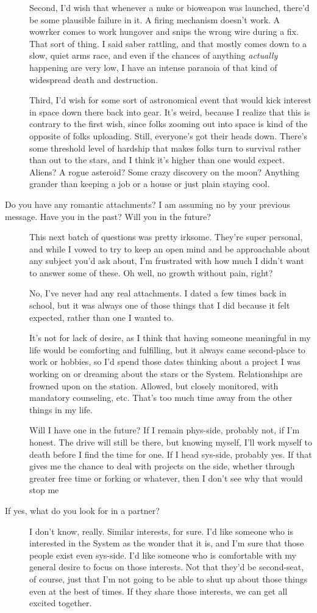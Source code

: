 \begin{description}
Second, I'd wish that whenever a nuke or bioweapon was launched, there'd be some plausible failure in it. A firing mechanism doesn't work. A wowrker comes to work hungover and snips the wrong wire during a fix. That sort of thing. I said saber rattling, and that mostly comes down to a slow, quiet arms race, and even if the chances of anything \emph{actually} happening are very low, I have an intense paranoia of that kind of widespread death and destruction.

Third, I'd wish for some sort of astronomical event that would kick interest in space down there back into gear. It's weird, because I realize that this is contrary to the first wish, since folks zooming out into space is kind of the opposite of folks uploading. Still, everyone's got their heads down. There's some threshold level of hardship that makes folks turn to survival rather than out to the stars, and I think it's higher than one would expect. Aliens? A rogue asteroid? Some crazy discovery on the moon? Anything grander than keeping a job or a house or just plain staying cool.
\item[Do you have any romantic attachments? I am assuming no by your previous message. Have you in the past? Will you in the future?]
This next batch of questions was pretty irksome. They're super personal, and while I vowed to try to keep an open mind and be approachable about any subject you'd ask about, I'm frustrated with how much I didn't want to answer some of these. Oh well, no growth without pain, right?

No, I've never had any real attachments. I dated a few times back in school, but it was always one of those things that I did because it felt expected, rather than one I wanted to.

It's not for lack of desire, as I think that having someone meaningful in my life would be comforting and fulfilling, but it always came second-place to work or hobbies, so I'd spend those dates thinking about a project I was working on or dreaming about the stars or the System. Relationships are frowned upon on the station. Allowed, but closely monitored, with mandatory counseling, etc. That's too much time away from the other things in my life.

Will I have one in the future? If I remain phys-side, probably not, if I'm honest. The drive will still be there, but knowing myself, I'll work myself to death before I find the time for one. If I head sys-side, probably yes. If that gives me the chance to deal with projects on the side, whether through greater free time or forking or whatever, then I don't see why that would stop me
\item[If yes, what do you look for in a partner?]
I don't know, really. Similar interests, for sure. I'd like someone who is interested in the System as the wonder that it is, and I'm sure that those people exist even sys-side. I'd like someone who is comfortable with my general desire to focus on those interests. Not that they'd be second-seat, of course, just that I'm not going to be able to shut up about those things even at the best of times. If they share those interests, we can get all excited together.


\end{description}
